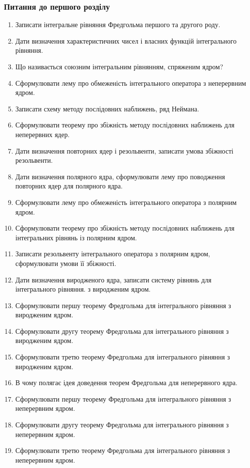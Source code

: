 \subsubsection{Питання до першого розділу}
\begin{enumerate}
\item Записати інтегральне рівняння Фредгольма першого та другого роду.
\item Дати визначення характеристичних чисел і власних функцій інтегрального рівняння.
\item Що називається союзним інтегральним рівнянням, спряженим ядром?
\item Сформулювати лему про обмеженість інтегрального оператора з неперервним ядром.
\item Записати схему методу послідовних наближень, ряд Неймана.
\item Сформулювати теорему про збіжність методу послідовних наближень для неперервних ядер.
\item Дати визначення повторних ядер і резольвенти, записати умова збіжності резольвенти.
\item Дати визначення полярного ядра, сформулювати лему про поводження повторних ядер для полярного ядра.
\item Сформулювати лему про обмеженість інтегрального оператора з полярним ядром.
\item Сформулювати теорему про збіжність методу послідовних наближень для інтегральних рівнянь із полярним ядром.
\item Записати резольвенту інтегрального оператора з полярним ядром, сформулювати умови її збіжності.
\item Дати визначення виродженого ядра, записати систему рівнянь для інтегрального рівняння. з виродженим ядром.
\item Сформулювати першу теорему Фредгольма для інтегрального рівняння з виродженим ядром.
\item Сформулювати другу теорему Фредгольма для інтегрального рівняння з виродженим ядром.
\item Сформулювати третю теорему Фредгольма для інтегрального рівняння з виродженим ядром.
\item В чому полягає ідея доведення теорем Фредгольма для неперервного ядра.
\item Сформулювати першу теорему Фредгольма для інтегрального рівняння з неперервним ядром.
\item Сформулювати другу теорему Фредгольма для інтегрального рівняння з неперервним ядром.
\item Сформулювати третю теорему Фредгольма для інтегрального рівняння з неперервним ядром.

\end{enumerate}
